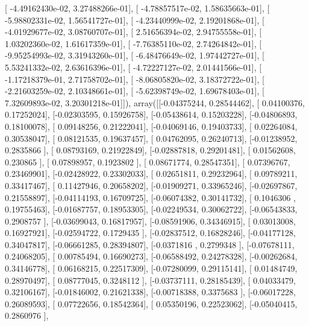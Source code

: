 \documentclass{article}
\begin{document}
       [ -4.49162430e-02,   3.27488266e-01],
       [ -4.78857517e-02,   1.58635663e-01],
       [ -5.98802331e-02,   1.56541727e-01],
       [ -4.23440999e-02,   2.19201868e-01],
       [ -4.01929677e-02,   3.08760707e-01],
       [  2.51656394e-02,   2.94755558e-01],
       [  1.03202360e-02,   1.61617359e-01],
       [ -7.76385110e-02,   2.74264842e-01],
       [ -9.95254993e-02,   3.31943260e-01],
       [ -6.48476649e-02,   1.97442727e-01],
       [  5.53241332e-02,   2.63616396e-01],
       [ -4.72227127e-02,   2.01441566e-01],
       [ -1.17218379e-01,   2.71758702e-01],
       [ -8.06805820e-02,   3.18372722e-01],
       [ -2.21603259e-02,   2.10348661e-01],
       [ -5.62398749e-02,   1.69678403e-01],
       [  7.32609893e-02,   3.20301218e-01]]), array([[-0.04375244,  0.28544462],
       [ 0.04100376,  0.17252024],
       [-0.02303595,  0.15926758],
       [-0.05438614,  0.15203228],
       [-0.04806893,  0.18100078],
       [ 0.09148256,  0.21222041],
       [-0.04069146,  0.19403733],
       [ 0.02264084,  0.30538047],
       [ 0.08121535,  0.19637457],
       [ 0.04762095,  0.26240713],
       [-0.01238952,  0.2835866 ],
       [ 0.08793169,  0.21922849],
       [-0.02887818,  0.29201481],
       [ 0.01562608,  0.230865  ],
       [ 0.07898957,  0.1923802 ],
       [ 0.08671774,  0.28547351],
       [ 0.07396767,  0.23469901],
       [-0.02428922,  0.23302033],
       [ 0.02651811,  0.29232964],
       [ 0.09789211,  0.33417467],
       [ 0.11427946,  0.20658202],
       [-0.01909271,  0.33965246],
       [-0.02697867,  0.21558897],
       [-0.04114193,  0.16709725],
       [-0.06074382,  0.30141732],
       [ 0.1046306 ,  0.19755463],
       [-0.01687757,  0.18953305],
       [-0.02249534,  0.30062722],
       [-0.06543833,  0.2908757 ],
       [-0.03699043,  0.16817957],
       [-0.08591906,  0.34346915],
       [ 0.03013008,  0.16927921],
       [-0.02594722,  0.1729435 ],
       [-0.02837512,  0.16828246],
       [-0.04177128,  0.34047817],
       [-0.06661285,  0.28394807],
       [-0.0371816 ,  0.2799348 ],
       [-0.07678111,  0.24068205],
       [ 0.00785494,  0.16690273],
       [-0.06588492,  0.24278328],
       [-0.00262684,  0.34146778],
       [ 0.06168215,  0.22517309],
       [-0.07280099,  0.29115141],
       [ 0.01484749,  0.28970497],
       [ 0.08777045,  0.3248112 ],
       [-0.03737111,  0.28185439],
       [ 0.04033479,  0.32106167],
       [-0.01846002,  0.21621338],
       [-0.00718388,  0.3375683 ],
       [-0.06017228,  0.26089593],
       [ 0.07722656,  0.18542364],
       [ 0.05350196,  0.22523062],
       [-0.05040415,  0.2860976 ],
\end{document}
